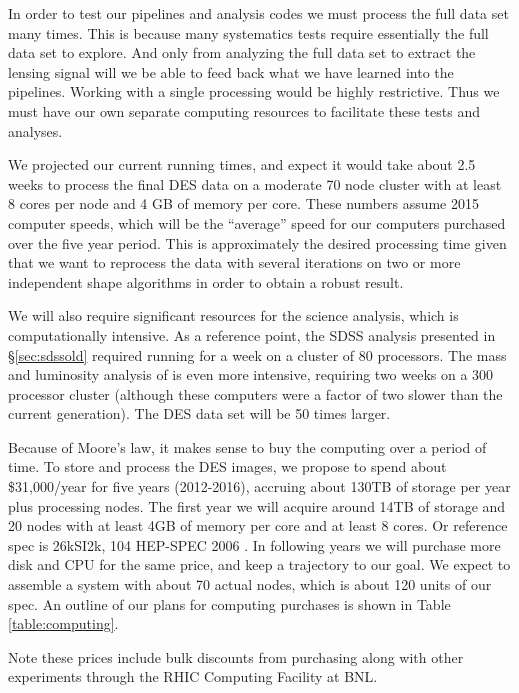 \documentclass[12pt]{article}
\begin{document}
In order to test our pipelines and analysis codes we must process the full data
set many times.  This is because many systematics tests require essentially
the full data set to explore.  And only from analyzing the full data set to
extract the lensing signal will we be able to feed back what we have learned
into the pipelines.  Working with a single processing would be highly
restrictive.  Thus we must have our own separate computing resources to
facilitate these tests and analyses.  

We projected our current running times, and expect it would take about 2.5
weeks to process the final DES data on a moderate 70 node cluster with at least
8 cores per node and 4 GB of memory per core.  These  numbers assume 2015
computer speeds, which will be the ``average'' speed for our computers
purchased over the five year period. This is approximately the desired
processing time given that we want to reprocess the data with several
iterations on two or more independent shape algorithms in order to obtain a
robust result.

We will also require significant resources for the science analysis, which is
computationally intensive.  As a reference point, the SDSS analysis presented
in \S \ref{sec:sdssold} required running for a week on a cluster of 80
processors.  The mass and luminosity analysis of \cite{SheldonM2L07} is even
more intensive, requiring two weeks on a 300 processor cluster (although these
computers were a factor of two slower than the current generation).  The DES
data set will be 50 times larger.

Because of Moore's law, it makes sense to buy the computing over a period of
time.  To store and process the DES images, we propose to spend about
\$31,000/year for five years (2012-2016), accruing about 130TB of storage per
year plus processing nodes.  The first year we will acquire around 14TB of
storage and 20 nodes with at least 4GB of memory per core and at least 8 cores.
Or reference spec is  26kSI2k, 104 HEP-SPEC 2006 .  In following years we will
purchase more disk and CPU for the same price, and keep a trajectory to our
goal.  We expect to assemble a system with about 70 actual nodes, which is
about 120 units of our spec.  An outline of our plans for computing
purchases is shown in Table \ref{table:computing}.

Note these prices include bulk discounts from purchasing along with other
experiments through the RHIC Computing Facility at BNL.  



\end{document}
